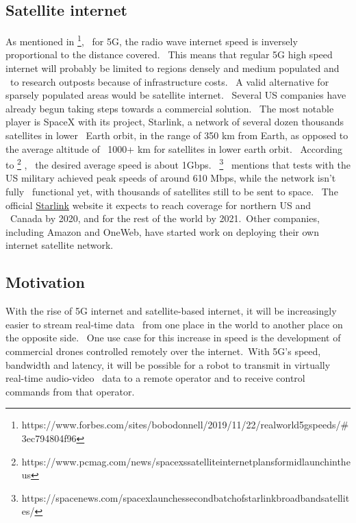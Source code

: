 \subsection{Satellite internet}
\label{subsec:satellite-internet}
As mentioned in \footnote{https://www.forbes.com/sites/bobodonnell/2019/11/22/real\-world\-5g\-speeds/\#3ec794804f96}, \
for 5G, the radio wave internet speed is inversely proportional to the distance covered. \
This means that regular 5G high speed internet will probably be limited to regions densely and medium populated and \
to research outposts because of infrastructure costs. \
A valid alternative for sparsely populated areas would be satellite internet. \
Several US companies have already begun taking steps towards a commercial solution. \
The most notable player is SpaceX with its project, Starlink, a network of several dozen thousands satellites in lower \
Earth orbit, in the range of 350 km from Earth, as opposed to the average altitude of \
1000+ km for satellites in lower earth orbit. \
According to \footnote{https://www.pcmag.com/news/spacexs\-satellite\-internet\-plans\-for\-mid\-launch\-in\-the\-us} , \
the desired average speed is about 1Gbps. \
 \footnote{https://spacenews.com/spacex\-launches\-second\-batch\-of\-starlink\-broadband\-satellites/} \
mentions that tests with the US military achieved peak speeds of around 610 Mbps, while the network isn't fully \
functional yet, with thousands of satellites still to be sent to space. \
The official \href{https://www.starlink.com/}{Starlink} website it expects to reach coverage for northern US and \
Canada by 2020, and for the rest of the world by 2021.\
Other companies, including Amazon and OneWeb, have started work on deploying their own internet satellite network.

\subsection{Motivation}
\label{subsec:introduction-motivation}
With the rise of 5G internet and satellite-based internet, it will be increasingly easier to stream real-time data \
from one place in the world to another place on the opposite side. \
One use case for this increase in speed is the development of commercial drones controlled remotely over the internet.\
With 5G's speed, bandwidth and latency, it will be possible for a robot to transmit in virtually real-time audio-video \
data to a remote operator and to receive control commands from that operator.


